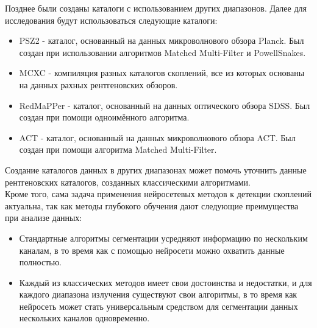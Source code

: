 Позднее были созданы каталоги с использованием других диапазонов. Далее для исследования будут 
использоваться следующие каталоги:\\

\begin{itemize}
\item PSZ2 - каталог, основанный на данных микроволнового обзора Planck. Был создан при 
    использовании алгоритмов Matched Multi-Filter и PowellSnakes.\\

\item MCXC - компиляция разных каталогов скоплений, все из которых основаны на данных рахных
    рентгеновских обзоров.\\

\item RedMaPPer - каталог, основанный на данных оптического обзора SDSS. Был создан при помощи 
    одноимённого алгоритма.\\

\item ACT - каталог, основанный на данных микроволнового обзора ACT. Был создан при помощи 
    алгоритма Matched Multi-Filter.\\
\end{itemize}

Создание каталогов данных в других диапазонах может помочь уточнить данные рентгеновских каталогов,
созданных классическими алгоритмами.\\

Кроме того, сама задача применения нейросетевых методов к детекции скоплений актуальна, так как 
методы глубокого обучения дают следующие преимущества при анализе данных:\\
\begin{itemize}
    \item Стандартные алгоритмы сегментации усредняют информацию по нескольким каналам, в то время 
        как с помощью нейросети можно охватить данные полностью.\\ 
    \item Каждый из классических методов имеет свои достоинства и недостатки, и для каждого 
        диапазона излучения существуют свои алгоритмы, в то время как нейросеть может стать 
        универсальным средством для сегментации данных нескольких каналов одновременно.\\
\end{itemize}


